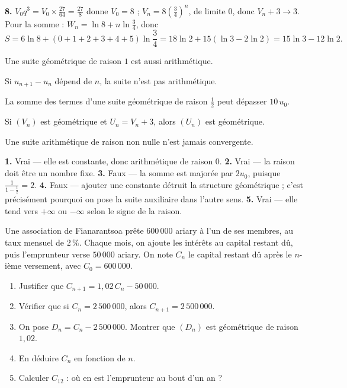 \begin{corrige}[annales]
\textbf{8.} $V_{0}q^{3} = V_{0}\times\frac{27}{64} = \frac{27}{8}$ donne
$V_{0} = 8$ ; $V_{n} = 8\left(\frac34\right)^{n}$, de limite $0$, donc
$V_{n}+3 \to 3$. Pour la somme :
$W_{n} = \ln 8+n\ln\frac34$, donc
\[
  S = 6\ln 8+\left(0+1+2+3+4+5\right)\ln\frac34
    = 18\ln 2+15\left(\ln 3-2\ln 2\right) = 15\ln 3-12\ln 2 .
\]
\end{corrige}

\begin{vraifaux}
\exo Une suite géométrique de raison $1$ est aussi arithmétique.

\exo Si $u_{n+1}-u_{n}$ dépend de $n$, la suite n'est pas arithmétique.

\exo La somme des termes d'une suite géométrique de raison $\frac12$ peut
dépasser $10\,u_{0}$.

\exo Si $\left(V_{n}\right)$ est géométrique et $U_{n} = V_{n}+3$, alors
$\left(U_{n}\right)$ est géométrique.

\exo Une suite arithmétique de raison non nulle n'est jamais convergente.
\end{vraifaux}

\begin{corrige}
\textbf{1.} Vrai — elle est constante, donc arithmétique de raison $0$.
\textbf{2.} Vrai — la raison doit être un nombre fixe.
\textbf{3.} Faux — la somme est majorée par $2u_{0}$, puisque
$\frac{1}{1-\frac12} = 2$.
\textbf{4.} Faux — ajouter une constante détruit la structure
géométrique ; c'est précisément pourquoi on pose la suite auxiliaire dans
l'autre sens.
\textbf{5.} Vrai — elle tend vers $+\infty$ ou $-\infty$ selon le signe de
la raison.
\end{corrige}

\begin{situation}
Une association de Fianarantsoa prête $600\,000$ ariary à l'un de ses
membres, au taux mensuel de $2\,\%$. Chaque mois, on ajoute les intérêts au
capital restant dû, puis l'emprunteur verse $50\,000$ ariary. On note
$C_{n}$ le capital restant dû après le $n$-ième versement, avec
$C_{0} = 600\,000$.

\begin{enumerate}[label=\textbf{\arabic*.}, leftmargin=*, itemsep=0.3em]
  \item Justifier que $C_{n+1} = 1{,}02\,C_{n}-50\,000$.
  \item Vérifier que si $C_{n} = 2\,500\,000$, alors
        $C_{n+1} = 2\,500\,000$.
  \item On pose $D_{n} = C_{n}-2\,500\,000$. Montrer que
        $\left(D_{n}\right)$ est géométrique de raison $1{,}02$.
  \item En déduire $C_{n}$ en fonction de $n$.
  \item Calculer $C_{12}$ : où en est l'emprunteur au bout d'un an ?
\end{enumerate}
\end{situation}


